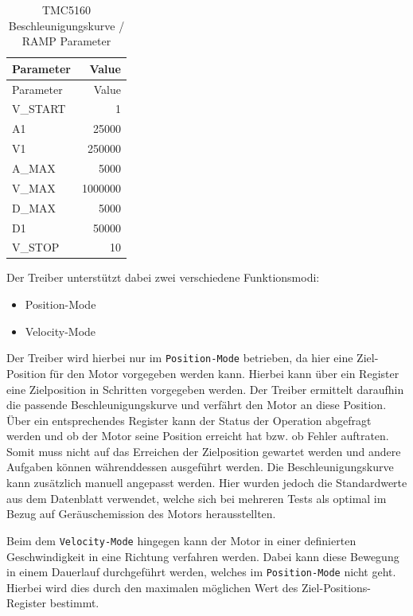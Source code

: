 \begin{longtable}[]{@{}lr@{}}
\caption{TMC5160 Beschleunigungskurve / RAMP Parameter
\label{tmcrampparams}}\tabularnewline
\toprule
Parameter & Value\tabularnewline
\midrule
\endfirsthead
\toprule
Parameter & Value\tabularnewline
\midrule
\endhead
V\_START & 1\tabularnewline
A1 & 25000\tabularnewline
V1 & 250000\tabularnewline
A\_MAX & 5000\tabularnewline
V\_MAX & 1000000\tabularnewline
D\_MAX & 5000\tabularnewline
D1 & 50000\tabularnewline
V\_STOP & 10\tabularnewline
\bottomrule
\end{longtable}

Der Treiber unterstützt dabei zwei verschiedene Funktionsmodi:

\begin{itemize}
\tightlist
\item
  Position-Mode
\item
  Velocity-Mode
\end{itemize}

Der Treiber wird hierbei nur im \passthrough{\lstinline!Position-Mode!}
betrieben, da hier eine Ziel-Position für den Motor vorgegeben werden
kann. Hierbei kann über ein Register eine Zielposition in Schritten
vorgegeben werden. Der Treiber ermittelt daraufhin die passende
Beschleunigungskurve und verfährt den Motor an diese Position. Über ein
entsprechendes Register kann der Status der Operation abgefragt werden
und ob der Motor seine Position erreicht hat bzw. ob Fehler auftraten.
Somit muss nicht auf das Erreichen der Zielposition gewartet werden und
andere Aufgaben können währenddessen ausgeführt werden. Die
Beschleunigungskurve kann zusätzlich manuell angepasst werden. Hier
wurden jedoch die Standardwerte aus dem Datenblatt verwendet, welche
sich bei mehreren Tests als optimal im Bezug auf Geräuschemission des
Motors herausstellten.

Beim dem \passthrough{\lstinline!Velocity-Mode!} hingegen kann der Motor
in einer definierten Geschwindigkeit in eine Richtung verfahren werden.
Dabei kann diese Bewegung in einem Dauerlauf durchgeführt werden,
welches im \passthrough{\lstinline!Position-Mode!} nicht geht. Hierbei
wird dies durch den maximalen möglichen Wert des Ziel-Positions-Register
bestimmt.

